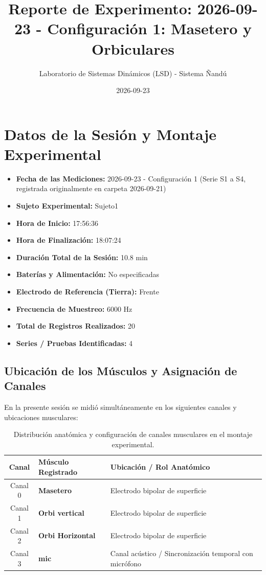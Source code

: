 \documentclass[11pt,a4paper]{article}
\title{\textbf{Reporte de Experimento: 2026-09-23 - Configuración 1: Masetero y Orbiculares}}
\author{Laboratorio de Sistemas Dinámicos (LSD) - Sistema Ñandú}
\date{2026-09-23}
\begin{document}
\maketitle

\section{Datos de la Sesión y Montaje Experimental}
\begin{itemize}
    \item \textbf{Fecha de las Mediciones:} 2026-09-23 - Configuración 1 (Serie S1 a S4, registrada originalmente en carpeta 2026-09-21)
    \item \textbf{Sujeto Experimental:} Sujeto1
    \item \textbf{Hora de Inicio:} 17:56:36
    \item \textbf{Hora de Finalización:} 18:07:24
    \item \textbf{Duración Total de la Sesión:} 10.8 min
    \item \textbf{Baterías y Alimentación:} No especificadas
    \item \textbf{Electrodo de Referencia (Tierra):} Frente
    \item \textbf{Frecuencia de Muestreo:} 6000 Hz
    \item \textbf{Total de Registros Realizados:} 20
    \item \textbf{Series / Pruebas Identificadas:} 4
\end{itemize}

\subsection{Ubicación de los Músculos y Asignación de Canales}
En la presente sesión se midió simultáneamente en los siguientes canales y ubicaciones musculares:
\begin{table}[H]
\centering
\begin{tabularx}{\textwidth}{c p{6.5cm} X}
\toprule
\textbf{Canal} & \textbf{Músculo Registrado} & \textbf{Ubicación / Rol Anatómico} \\
\midrule
Canal 0 & \textbf{Masetero} & Electrodo bipolar de superficie \\
Canal 1 & \textbf{Orbi vertical} & Electrodo bipolar de superficie \\
Canal 2 & \textbf{Orbi Horizontal} & Electrodo bipolar de superficie \\
Canal 3 & \textbf{mic} & Canal acústico / Sincronización temporal con micrófono \\
\bottomrule
\end{tabularx}
\caption{Distribución anatómica y configuración de canales musculares en el montaje experimental.}
\end{table}
\end{document}
